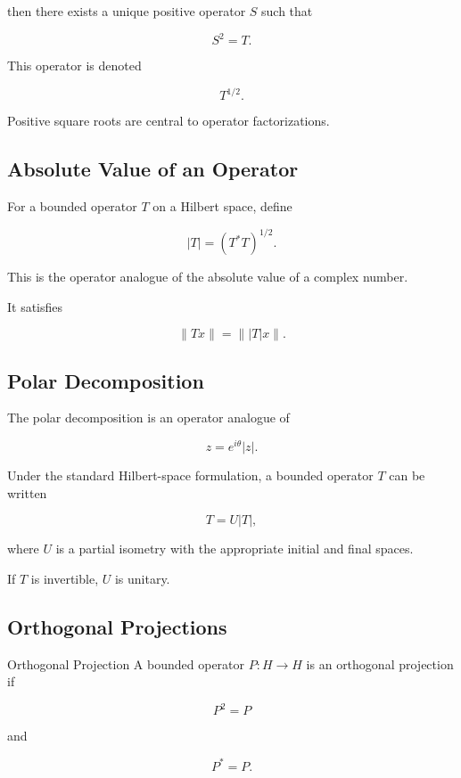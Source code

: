 then there exists a unique positive operator \(S\) such that

\[
\boxed{
S^2=T.
}
\]

This operator is denoted

\[
\boxed{
T^{1/2}.
}
\]

Positive square roots are central to operator factorizations.

\subsection{Absolute Value of an Operator}
\label{subsec:absolute-value-operator}

For a bounded operator \(T\) on a Hilbert space, define

\[
\boxed{
|T|
=
(T^*T)^{1/2}.
}
\]

This is the operator analogue of the absolute value of a complex number.

It satisfies

\[
\boxed{
\|Tx\|
=
\||T|x\|.
}
\]

\subsection{Polar Decomposition}
\label{subsec:polar-decomposition}

The polar decomposition is an operator analogue of

\[
z
=
e^{i\theta}|z|.
\]

Under the standard Hilbert-space formulation, a bounded operator \(T\)
can be written

\[
\boxed{
T=U|T|,
}
\]

where \(U\) is a partial isometry with the appropriate initial and final
spaces.

If \(T\) is invertible, \(U\) is unitary.

\subsection{Orthogonal Projections}
\label{subsec:orthogonal-projections}

\begin{definitionbox}{Orthogonal Projection}
A bounded operator \(P:H\to H\) is an orthogonal projection if

\[
\boxed{
P^2=P
}
\]

and

\[
\boxed{
P^*=P.
}
\]
\end{definitionbox}

